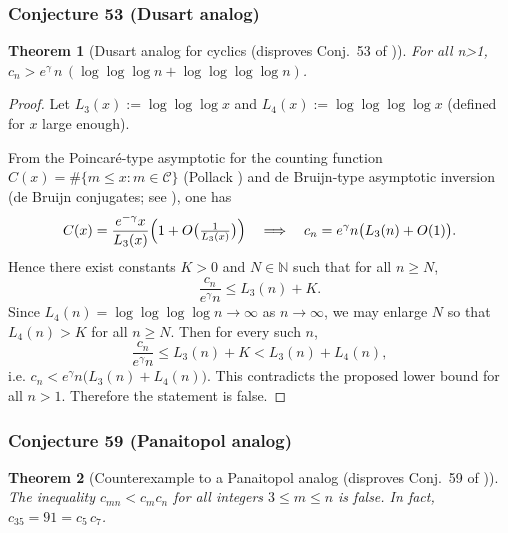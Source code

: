 \documentclass[12pt]{article}
\newtheorem{theorem}{Theorem}
\theoremstyle{remark}
\begin{document}


\subsubsection{Conjecture 53 (Dusart analog)}
\begin{theorem}[Dusart analog for cyclics (disproves Conj.~53 of \cite{Cohen2025})]\label{thm:dusart_cyclics}
For all n>1, \(c_n>e^{\gamma}\,n\,(\log\log\log n+\log\log\log\log n)\).
\end{theorem}

\begin{proof}
Let $L_3(x):=\log\log\log x$ and $L_4(x):=\log\log\log\log x$ (defined for $x$ large enough).

From the Poincar\'e-type asymptotic for the counting function $C(x)=\#\{m\le x: m\in\mathcal C\}$ (Pollack \cite{Pollack2022}) and de Bruijn-type asymptotic inversion (de Bruijn conjugates; see \cite{deBruijn1970}), one has
$$
C(x)=\frac{e^{-\gamma}x}{L_3(x)}\Bigl(1+O\bigl(\tfrac{1}{L_3(x)}\bigr)\Bigr)
\quad\Longrightarrow\quad
c_n=e^{\gamma}n\bigl(L_3(n)+O(1)\bigr).
$$
Hence there exist constants $K>0$ and $N\in\mathbb N$ such that for all $n\ge N$,
$$
\frac{c_n}{e^{\gamma}n}\le L_3(n)+K.
$$
Since $L_4(n)=\log\log\log\log n\to\infty$ as $n\to\infty$, we may enlarge $N$ so that $L_4(n)>K$ for all $n\ge N$. Then for every such $n$,
$$
\frac{c_n}{e^{\gamma}n}\le L_3(n)+K< L_3(n)+L_4(n),
$$
i.e. $c_n< e^{\gamma}n\bigl(L_3(n)+L_4(n)\bigr)$. This contradicts the proposed lower bound for all $n>1$. Therefore the statement is false. 
\end{proof}


\subsubsection{Conjecture 59 (Panaitopol analog)}
\begin{theorem}[Counterexample to a Panaitopol analog (disproves Conj.~59 of \cite{Cohen2025})]\label{thm:panaitopol}
The inequality $c_{mn}<c_m c_n$ for all integers $3\le m\le n$ is false. In fact, $c_{35}=91=c_5\,c_7$.
\end{theorem}
\end{document}
